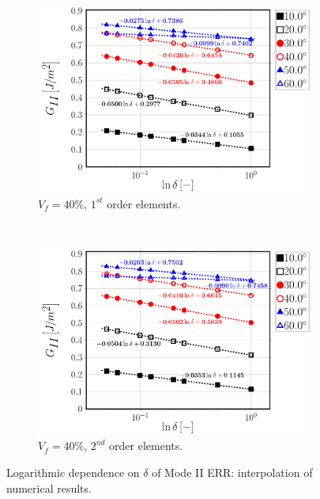 \begin{figure}[!h]
    \begin{subfigure}[b]{0.45\textwidth}
        \includegraphics[width=\textwidth]{paperA/Vf40-free-1st-semilogvsDelta-GII.pdf}
       \caption{$V_{f}=40\%$, $1^{st}$ order elements.}
    \end{subfigure}
    ~
    \begin{subfigure}[b]{0.45\textwidth}
        \includegraphics[width=\textwidth]{paperA/Vf40-free-2nd-semilogvsDelta-GII.pdf}
       \caption{$V_{f}=40\%$, $2^{nd}$ order elements.}
    \end{subfigure}

\caption{Logarithmic dependence on $\delta$ of Mode II ERR: interpolation of numerical results.}\label{chap3:paperA:fig:gIIinterp}
\end{figure}

